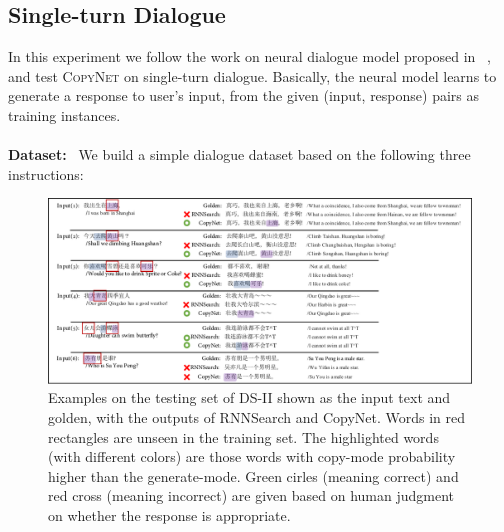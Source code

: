 \subsection{Single-turn Dialogue}
In this experiment we follow the work on neural dialogue model proposed in ~\cite{shang2015neural,vinyals2015neural,sordoni2015neural}, and test \textsc{CopyNet} on single-turn dialogue. Basically, the neural model learns to generate a response to user's input, from the given (input, response) pairs as training instances.
\\ \vspace{-7pt} \\
\textbf{Dataset:}~ 
 We build a simple dialogue dataset based on the following three instructions: 
  \begin{figure}[htbp]
   	\centering
          	\vspace{-3pt}
          	\includegraphics[width=.99\linewidth]{figs/copynet/ds-exp-rX.pdf} 
          	\vspace{-5pt}
          	\caption{\label{ds-exp} Examples on the testing set of DS-II shown as the input text and golden, with the outputs of RNNSearch and CopyNet. Words in red rectangles are unseen in the training set. The highlighted words (with different colors) are those words with copy-mode probability higher than the generate-mode. Green cirles (meaning correct) and red cross (meaning incorrect) are given based on human judgment on whether the response is appropriate. } 
   \vspace{-9pt}
  \end{figure}   
